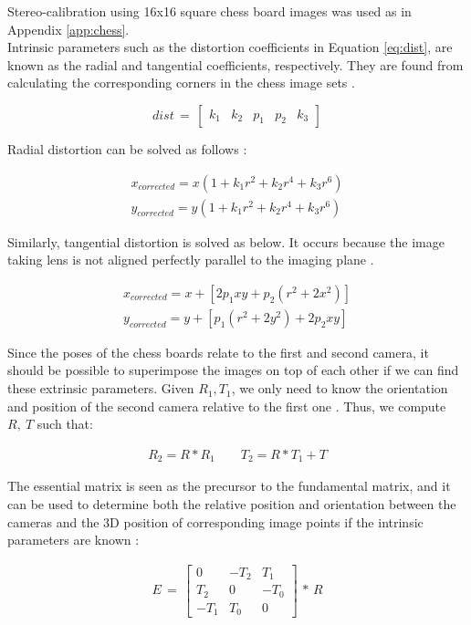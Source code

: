 Stereo-calibration using 16x16 square chess board images was used as in Appendix \ref{app:chess}.\\

Intrinsic parameters such as the distortion coefficients in Equation \ref{eq:dist}, are known as the radial and tangential coefficients, respectively. They are found from calculating the corresponding corners in the chess image sets \cite{calib3d}.

\begin{equation}\label{eq:dist}
dist\,=\,\begin{bmatrix}
k_1 & k_2 & p_1 & p_2 & k_3
\end{bmatrix}
\end{equation}

Radial distortion can be solved as follows \cite{calib3d}:

\begin{align*}
x_{corrected} = x( 1 + k_1 r^2 + k_2 r^4 + k_3 r^6) \\
y_{corrected} = y( 1 + k_1 r^2 + k_2 r^4 + k_3 r^6)
\end{align*}

Similarly, tangential distortion is solved as below. It occurs because the image taking lens is not aligned perfectly parallel to the imaging plane \cite{calib3d}.

\begin{align*}
x_{corrected} = x + [ 2p_1xy + p_2(r^2+2x^2)] \\
y_{corrected} = y + [ p_1(r^2+ 2y^2)+ 2p_2xy]
\end{align*}

Since the poses of the chess boards relate to the first and second camera, it should be possible to superimpose the images on top of each other if we can find these extrinsic parameters. Given $R_1, T_1$, we only need to know the orientation and position of the second camera relative to the first one \cite{calib3d}. Thus, we compute $R,\ T$ such that:

\begin{align*}R_2=R*R_1\quad\quad T_2=R*T_1 + T \end{align*}

The essential matrix is seen as the precursor to the fundamental matrix, and it can be used to determine both the relative position and orientation between the cameras and the 3D position of corresponding image points if the intrinsic parameters are known \cite{calib3d}:

\begin{align*}
E\,=\,\begin{bmatrix}
{0} & {-T_2} & {T_1}\\
{T_2} & {0} & {-T_0}\\
{-T_1} & {T_0} & {0} 
\end{bmatrix}\,*\,R
\end{align*}

